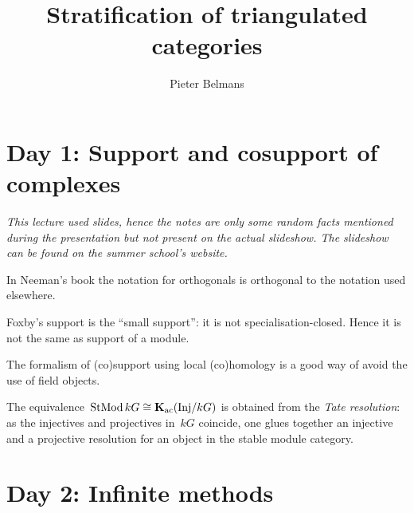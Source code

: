 \documentclass[10pt,a4paper]{article}
\title{Stratification of triangulated categories}
\author{Pieter Belmans}
\begin{document}
\maketitle

\tableofcontents

\clearpage

\section{Day 1: Support and cosupport of complexes}
\emph{This lecture used slides, hence the notes are only some random facts mentioned during the presentation but not present on the actual slideshow. The slideshow can be found on the summer school's website.}

\begin{remark}
  In Neeman's book the notation for orthogonals is orthogonal to the notation used elsewhere.
\end{remark}
\begin{remark}
  Foxby's support is the ``small support'': it is not specialisation-closed. Hence it is not the same as support of a module.
\end{remark}
\begin{remark}
  The formalism of (co)support using local (co)homology is a good way of avoid the use of field objects.
\end{remark}
\begin{remark}
  The equivalence~$\operatorname{StMod} kG\cong\operatorname{\mathbf{K}}_{\mathrm{ac}}(\mathrm{Inj}/kG)$ is obtained from the \emph{Tate resolution}: as the injectives and projectives in~$kG$ coincide, one glues together an injective and a projective resolution for an object in the stable module category.
\end{remark}


\section{Day 2: Infinite methods}
\end{document}
